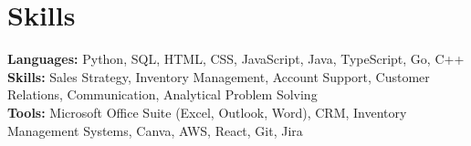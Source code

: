 \documentclass[11pt]{article}       %
\begin{document}
\vspace{-18.5pt}


\section*{Skills}
\textbf{Languages:} Python, SQL, HTML, CSS, JavaScript, Java, TypeScript, Go, C++\\
\textbf{Skills:} Sales Strategy, Inventory Management, Account Support, Customer Relations, Communication, Analytical Problem Solving\\
\textbf{Tools:} Microsoft Office Suite (Excel, Outlook, Word), CRM, Inventory Management Systems, Canva, AWS, React, Git, Jira\\

\vspace{-6.5pt}
\end{document}
